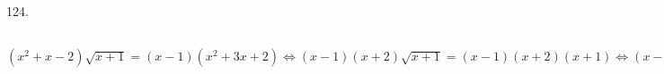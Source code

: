 124. $(x^2+x-2)\sqrt{x+1}=(x-1)(x^2+3x+2)\Leftrightarrow(x-1)(x+2)\sqrt{x+1}=(x-1)(x+2)(x+1)\Leftrightarrow
(x-1)(x+2)(\sqrt{x+1}-x-1)=0\Leftrightarrow
\begin{cases}\left[\begin{array}{l} x=1,\\ x=-2,\\ \sqrt{x+1}=x+1.\end{array}
ight.\\ x\geqslant-1.\end{cases}\Leftrightarrow
\begin{cases}\left[\begin{array}{l} x=1,\\ x+1=x^2+2x+1.\end{array}
ight.\\ x\geqslant-1.\end{cases}\Leftrightarrow
\begin{cases}\left[\begin{array}{l} x=1,\\ x(x+1)=0.\end{array}
ight.\\ x\geqslant-1.\end{cases}\Leftrightarrow x\in\{-1;0;1\}$\\
